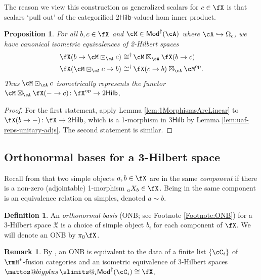 \documentclass[12pt, reqno]{amsart}
\makeatletter
\newcommand{\op}{\mathrm{op}}
\newcommand{\Mod}{\mathsf{Mod}}
\newcommand{\Hilb}{\mathsf{Hilb}}
\theoremstyle{plain}
\newtheorem{prop}[thm]{Proposition}
\theoremstyle{definition}
\newtheorem{defn}[thm]{Definition}
\newtheorem{rem}[thm]{Remark}
\DeclareMathOperator{\isomeq}{\mathbin{\,\cong^\dag}}
\newcommand{\bigboxplus}{%
  \DOTSB\mathop{\mathpalette\mattos@bigplus\relax}\slimits@
}
\newcommand\mattos@bigplus[2]{%
  \vcenter{\hbox{%
    \sbox\z@{$#1\sum$}%
    \resizebox{!}{0.9\dimexpr\ht\z@+\dp\z@}{\raisebox{\depth}{$\m@th#1\boxplus$}}%
  }}%
  \vphantom{\sum}%
}
\makeatother
\begin{document}
The reason we view this construction as generalized scalars for $c\in \fX$ is that scalars `pull out' of the categorified $2\Hilb$-valued hom inner product.

\begin{prop}
\label{prop:2HilbertScalarsPullOut}
For all $b,c\in \fX$ and $\cM\in \Mod^\dag(\cA)$ where $\cA\hookrightarrow \Omega_c$,
we have canonical isometric equivalences of 2-Hilbert spaces
\begin{align*}
\fX(b\to \cM\boxdot_{\cA} c) 
&\isomeq
\cM\boxtimes_{\cA}\fX(b\to c)
\\
\fX(\cM\boxdot_{\cA} c\to b) 
&\isomeq
\fX(c\to b)\boxtimes_{\cA} \cM^{\op}.
\end{align*}
Thus $\cM\boxdot_\cA c$ isometrically represents the functor $\cM\boxtimes_\cA\fX(-\to c)\colon  \fX^{\op}\to 2\Hilb$.
\end{prop}
\begin{proof}
For the first statement, apply Lemma \ref{lem:1MorphismsAreLinear} to 
$\fX(b\to -)\colon \fX\to 2\Hilb$, which is a 1-morphism in $3\Hilb$ by Lemma \ref{lem:uaf-reps-unitary-adjs}.
The second statement is similar.
\end{proof}


\subsection{Orthonormal bases for a 3-Hilbert space}
\label{subsec:ONBS}
Recall from \cite[Def.~1.2.22]{1812.11933} that two simple objects $a,b\in\fX$ are in the same \emph{component} if there is a non-zero (adjointable) 1-morphism ${}_aX_b\in \fX$.
Being in the same component is an equivalence relation on simples, denoted $a\sim b$.

\begin{defn}\label{defn:ONB}
An \emph{orthonormal basis} (ONB; see Footnote \ref{Footnote:ONB})
for a 3-Hilbert space $\mathfrak X$ is a choice of simple object $b_i$ for each component of $\fX$.
We will denote an ONB by $\pi_0\fX$.
\end{defn}

\begin{rem}
By 
\cite[Cor.~4.52]{MR5078555},
an ONB is equivalent to the data of a finite list $\{\cC_i\}$ of $\rmH^*$-fusion categories and an isometric equivalence of 3-Hilbert spaces $\bigboxplus_i \Mod^\dag(\cC_{i}) \cong \fX$. 
\end{rem}
\end{document}
